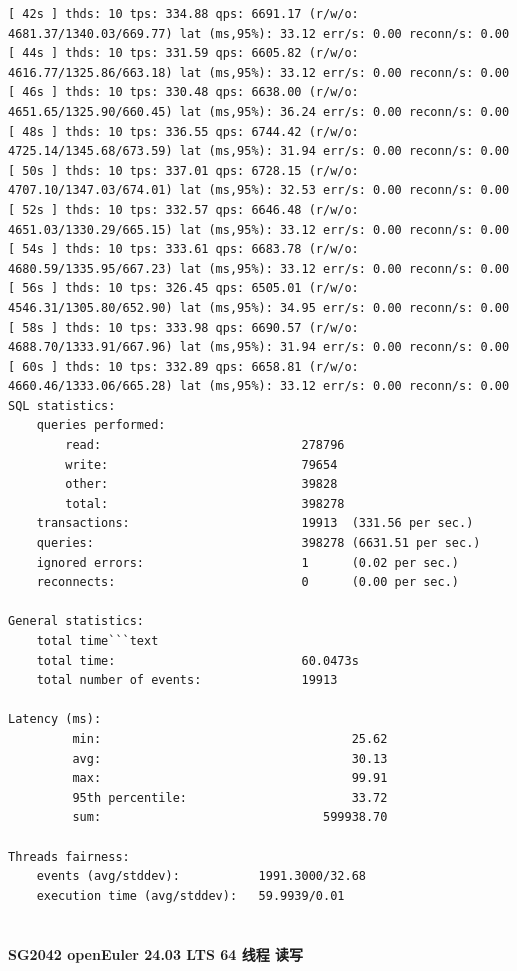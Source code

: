 \documentclass{article}
\begin{document}
\begin{verbatim}
[ 42s ] thds: 10 tps: 334.88 qps: 6691.17 (r/w/o: 4681.37/1340.03/669.77) lat (ms,95%): 33.12 err/s: 0.00 reconn/s: 0.00
[ 44s ] thds: 10 tps: 331.59 qps: 6605.82 (r/w/o: 4616.77/1325.86/663.18) lat (ms,95%): 33.12 err/s: 0.00 reconn/s: 0.00
[ 46s ] thds: 10 tps: 330.48 qps: 6638.00 (r/w/o: 4651.65/1325.90/660.45) lat (ms,95%): 36.24 err/s: 0.00 reconn/s: 0.00
[ 48s ] thds: 10 tps: 336.55 qps: 6744.42 (r/w/o: 4725.14/1345.68/673.59) lat (ms,95%): 31.94 err/s: 0.00 reconn/s: 0.00
[ 50s ] thds: 10 tps: 337.01 qps: 6728.15 (r/w/o: 4707.10/1347.03/674.01) lat (ms,95%): 32.53 err/s: 0.00 reconn/s: 0.00
[ 52s ] thds: 10 tps: 332.57 qps: 6646.48 (r/w/o: 4651.03/1330.29/665.15) lat (ms,95%): 33.12 err/s: 0.00 reconn/s: 0.00
[ 54s ] thds: 10 tps: 333.61 qps: 6683.78 (r/w/o: 4680.59/1335.95/667.23) lat (ms,95%): 33.12 err/s: 0.00 reconn/s: 0.00
[ 56s ] thds: 10 tps: 326.45 qps: 6505.01 (r/w/o: 4546.31/1305.80/652.90) lat (ms,95%): 34.95 err/s: 0.00 reconn/s: 0.00
[ 58s ] thds: 10 tps: 333.98 qps: 6690.57 (r/w/o: 4688.70/1333.91/667.96) lat (ms,95%): 31.94 err/s: 0.00 reconn/s: 0.00
[ 60s ] thds: 10 tps: 332.89 qps: 6658.81 (r/w/o: 4660.46/1333.06/665.28) lat (ms,95%): 33.12 err/s: 0.00 reconn/s: 0.00
SQL statistics:
    queries performed:
        read:                            278796
        write:                           79654
        other:                           39828
        total:                           398278
    transactions:                        19913  (331.56 per sec.)
    queries:                             398278 (6631.51 per sec.)
    ignored errors:                      1      (0.02 per sec.)
    reconnects:                          0      (0.00 per sec.)

General statistics:
    total time```text
    total time:                          60.0473s
    total number of events:              19913

Latency (ms):
         min:                                   25.62
         avg:                                   30.13
         max:                                   99.91
         95th percentile:                       33.72
         sum:                               599938.70

Threads fairness:
    events (avg/stddev):           1991.3000/32.68
    execution time (avg/stddev):   59.9939/0.01
    
\end{verbatim}

\paragraph{SG2042 openEuler 24.03 LTS 64 线程 读写}
\end{document}
